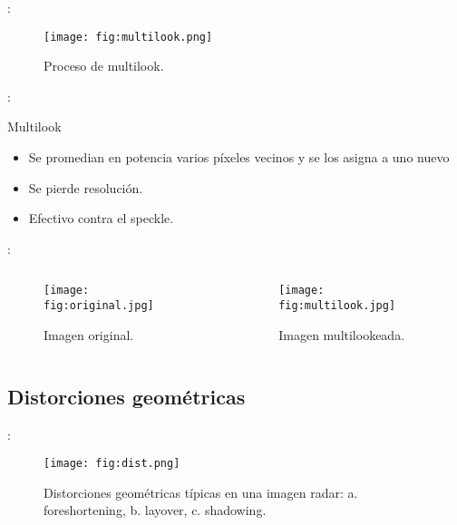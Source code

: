 \begin{frame}{\secname : \subsecname}
      \begin{figure}
        \centering
        \texttt{[image: fig:multilook.png]}
        \caption{Proceso de multilook.}
        \label{}
      \end{figure}
\end{frame}


\begin{frame}{\secname : \subsecname}

   \begin{block}{Multilook}
     \begin{itemize}
       \item Se promedian en potencia varios píxeles vecinos y se los asigna a uno nuevo
       \item Se pierde resolución.
       \item Efectivo contra el speckle.
     \end{itemize}
   \end{block}

\end{frame}

\begin{frame}{\secname : \subsecname}
  \begin{columns}
  \begin{column}{0.5\textwidth}
    \begin{figure}
      \centering
      \texttt{[image: fig:original.jpg]}
      \caption{Imagen original.}
      \label{}
    \end{figure}
  \end{column}
  \begin{column}{0.5\textwidth}  %
    \begin{figure}
      \centering
      \texttt{[image: fig:multilook.jpg]}
      \caption{Imagen multilookeada.}
      \label{}
    \end{figure}
  \end{column}
  \end{columns}
\end{frame}


\subsection{Distorciones geométricas}
\begin{frame}{\secname : \subsecname}
      \begin{figure}
        \centering
        \texttt{[image: fig:dist.png]}
        \caption{Distorciones geométricas típicas en una imagen radar: a. foreshortening, b. layover, c. shadowing.}
        \label{}
      \end{figure}
\end{frame}

